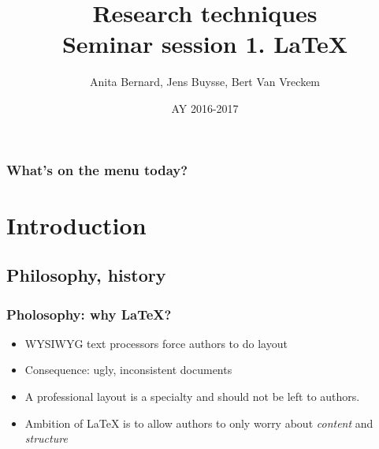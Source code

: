 \documentclass{beamer}
\title[Intro]{Research techniques\\Seminar session 1. \LaTeX{}}
\author{Anita Bernard, Jens Buysse, Bert {Van Vreckem}}
\date{AY 2016-2017}
\begin{document}

\HoGentLogo

\titleframe


\begin{frame}
  \frametitle{What's on the menu today?}

  \tableofcontents
\end{frame}

\section{Introduction}

\subsection{Philosophy, history}

\begin{frame}
  \frametitle{Pholosophy: why {\LaTeX}?}
  
  \begin{itemize}
  \item<+-> WYSIWYG text processors force authors to do layout
  \item<+-> Consequence: ugly, inconsistent documents
  \item<+-> A professional layout is a specialty and should not be left to authors.
  \item<+-> Ambition of {\LaTeX} is to allow authors to only worry about \emph{content} and \emph{structure}
  \end{itemize}
\end{frame}
\end{document}
